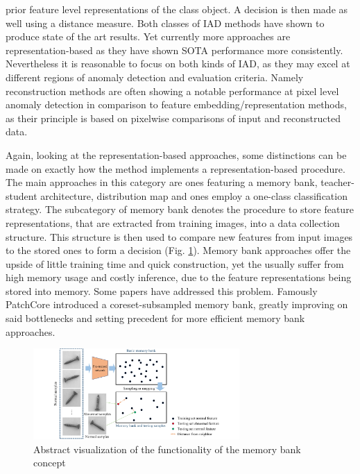 prior feature level representations of the class object. A decision is then made as well using a distance measure.\newline
Both classes of IAD methods have shown to produce state of the art results. Yet currently more approaches are representation-based \cite{liu2024deep} as they have shown SOTA performance more 
consistently. Nevertheless it is reasonable to focus on both kinds of IAD, as they may excel at different regions of anomaly detection and evaluation criteria. Namely reconstruction methods are 
often showing a notable performance at pixel level anomaly detection in comparison to feature embedding/representation methods, as their principle is based on pixelwise comparisons of input 
and reconstructed data.
\newline


Again, looking at the representation-based approaches, some distinctions can be made on exactly how the method implements a representation-based procedure.
The main approaches in this category are ones featuring a memory bank, teacher-student architecture, distribution map and ones employ a one-class classification strategy. The subcategory of 
memory bank denotes the procedure to store feature representations, that are extracted from training images, into a data collection structure. This structure is then used to compare new 
features from input images to the stored ones to form a decision (Fig. \ref{fig:memorybankviz}). Memory bank approaches offer the upside of little training time and quick construction, yet the usually suffer from high memory 
usage and costly inference, due to the feature representations being stored into memory. Some papers have addressed this problem. Famously PatchCore \cite{patchCore2022} introduced a coreset-subsampled 
memory bank, greatly improving on said bottlenecks and setting precedent for more efficient memory bank approaches. \newline

\begin{figure}[H]
    \centering
    \includegraphics[width=0.7\textwidth]{figures/approachvizgeneral/memorybankviz.jpg}
    \caption{Abstract visualization of the functionality of the memory bank concept \cite{liu2024deep}}
    \label{fig:memorybankviz}
\end{figure}


